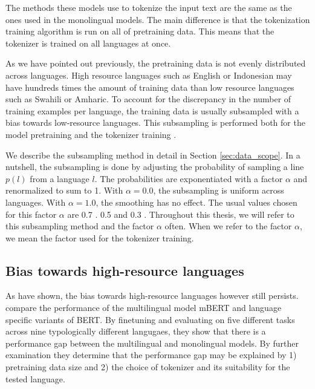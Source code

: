 The methods these models use to tokenize the input text are the same as the ones used in the monolingual models. The main difference is that the tokenization training algorithm is run on all of pretraining data. This means that the tokenizer is trained on all languages at once. 

As we have pointed out previously, the pretraining data is not evenly distributed across languages. High resource languages such as English or Indonesian may have hundreds times the amount of training data than low resource languages such as Swahili or Amharic. To account for the discrepancy in the number of training examples per language, the training data is usually subsampled with a bias towards low-resource languages. This subsampling is performed both for the model pretraining and the tokenizer training \cite{devlin_bert_2019,lample_cross-lingual_2019}. 

We describe the subsampling method in detail in Section \ref{sec:data_scope}. In a nutshell, the subsampling is done by adjusting the probability of sampling a line $p(l)$ from a language $l$. The probabilities are exponentiated with a factor $\alpha$ and renormalized to sum to 1. With $\alpha=0.0$, the subsampling is uniform across languages. With $\alpha=1.0$, the smoothing has no effect. The usual values chosen for this factor $\alpha$ are 0.7 \cite{devlin_bert_2019}. 0.5 \cite{lample_cross-lingual_2019} and 0.3 \cite{conneau_unsupervised_2020}. Throughout this thesis, we will refer to this subsampling method and the factor $\alpha$ often. When we refer to the factor $\alpha$, we mean the factor used for the tokenizer training.

\subsection{Bias towards high-resource languages}

As \citet{rust_how_2021} have shown, the bias towards high-resource languages however still persists. \citet{rust_how_2021} compare the performance of the multilingual model mBERT and language specific variants of BERT. By finetuning and evaluating on five different tasks across nine typologically different langugaes, they show that there is a performance gap between the multilingual and monolingual models. By further examination they determine that the performance gap may be explained by 1) pretraining data size and 2) the choice of tokenizer and its suitability for the tested language. 

